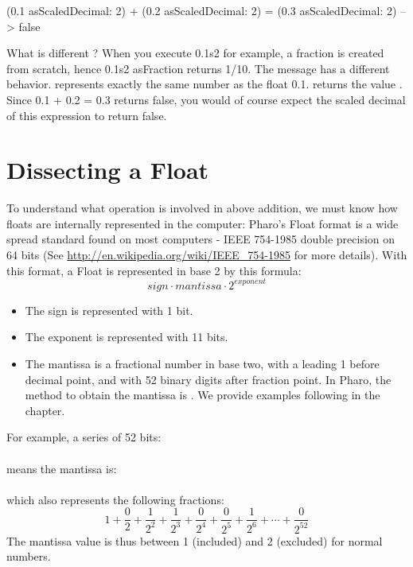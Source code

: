 \documentclass[a4paper,10pt,twoside]{book}
\begin{document}
\begin{code}{}	
(0.1 asScaledDecimal: 2) + (0.2 asScaledDecimal: 2) = (0.3 asScaledDecimal: 2) 
	--> false
\end{code}

What is different ? When you execute 0.1s2 for example, a fraction is created from scratch, hence 0.1s2 asFraction returns 1/10. The message  has a different behavior.
 represents exactly the same number as the float 0.1.  returns the value .
Since 0.1 + 0.2 = 0.3 returns false, you would of course expect the scaled decimal of this expression to return false.

\section{Dissecting a Float}
To understand what operation is involved in above addition, we must know how floats are internally represented in the computer: Pharo's Float format is a wide spread standard found on most computers - IEEE 754-1985 double precision on 64 bits
(See \url{http://en.wikipedia.org/wiki/IEEE_754-1985} for more details).
With this format, a Float is represented in base 2 by this formula: \[ sign \cdot mantissa \cdot 2^{exponent} \]
\begin{itemize}
\item The sign is represented with 1 bit.
\item The exponent is represented with 11 bits.
\item The mantissa is a fractional number in base two, with a leading 1 before decimal point, and with 52 binary digits after fraction point. In Pharo, the method to obtain the mantissa is . We provide examples following in the chapter.
\end{itemize}

For example, a series of 52 bits:\\
\\
 means the mantissa is:\\
 \\
 which also represents the following fractions:  \[ 1 + \frac{0}{2} +  \frac{1}{2^2} +  \frac{1}{2^3} +  \frac{0}{2^4} +  \frac{0}{2^5} +  \frac{1}{2^6} + \cdots  +  \frac{0}{2^{52}} \]
The mantissa value is thus between 1 (included) and 2 (excluded) for normal numbers.
\end{document}
